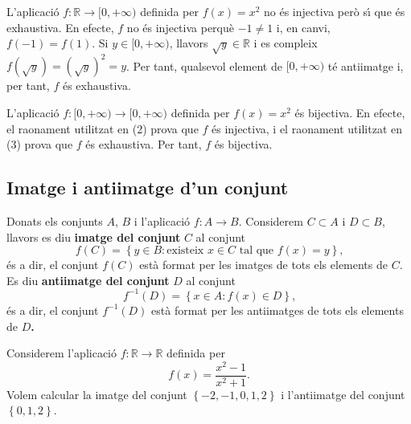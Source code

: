 \begin{exem}
L'aplicaci\'{o} $f:\mathbb{R}\longrightarrow\lbrack0,+\infty)$ definida per $%
f(x)=x^{2}$ no \'{e}s injectiva per\`{o} s\'{\i} que \'{e}s exhaustiva. En
efecte, $f$ no \'{e}s injectiva perqu\`{e} $-1\neq1$ i, en canvi, $f(-1)=f(1)
$. Si $y\in\lbrack0,+\infty)$, llavors $\sqrt{y}\in\mathbb{R}$ i es compleix
$f\left( \sqrt{y}\right) =\left( \sqrt{y}\right) ^{2}=y$. Per tant,
qualsevol element de $[0,+\infty)$ t\'{e} antiimatge i, per tant, $f$ \'{e}s
exhaustiva.
\end{exem}

\begin{exem}
L'aplicaci\'{o} $f:[0,+\infty)\longrightarrow\lbrack0,+\infty)$ definida per
$f(x)=x^{2}$ \'{e}s bijectiva. En efecte, el raonament utilitzat en (2)
prova que $f$ \'{e}s injectiva, i el raonament utilitzat en (3) prova que $f$
\'{e}s exhaustiva. Per tant, $f$ \'{e}s bijectiva.
\end{exem}

\subsection{Imatge i antiimatge d'un conjunt}

Donats els conjunts $A$, $B$ i l'aplicaci\'{o} $f:A\longrightarrow B$.
Considerem $C\subset A$ i $D\subset B$, llavors es diu \textbf{imatge del
conjunt} $C$ al conjunt%
\begin{equation*}
f(C)=\left\{ y\in B:\text{existeix }x\in C\text{ tal que }f(x)=y\right\}
\text{,}
\end{equation*}
\'{e}s a dir, el conjunt $f(C)$ est\`{a} format per les imatges de tots els
elements de $C$. Es diu \textbf{antiimatge del conjunt} $D$ al conjunt%
\begin{equation*}
f^{-1}(D)=\left\{ x\in A:f(x)\in D\right\} \text{,}
\end{equation*}
\'{e}s a dir, el conjunt $f^{-1}(D)$ est\`{a} format per les antiimatges de
tots els elements de $D$\textbf{. }

\begin{exem}
Considerem l'aplicaci\'{o} $f:\mathbb{R}\longrightarrow\mathbb{R}$ definida
per%
\begin{equation*}
f(x)=\frac{x^{2}-1}{x^{2}+1}\text{.}
\end{equation*}
Volem calcular la imatge del conjunt $\left\{ -2,-1,0,1,2\right\} $ i
l'antiimatge del conjunt $\left\{ 0,1,2\right\} $.
\end{exem}

